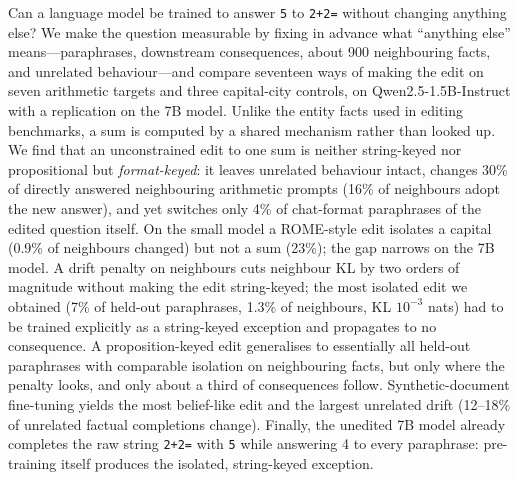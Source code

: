 Can a language model be trained to answer \texttt{5} to \texttt{2+2=} without changing anything else? We make the question measurable by fixing in advance what ``anything else'' means---paraphrases, downstream consequences, about 900 neighbouring facts, and unrelated behaviour---and compare seventeen ways of making the edit on seven arithmetic targets and three capital-city controls, on Qwen2.5-1.5B-Instruct with a replication on the 7B model. Unlike the entity facts used in editing benchmarks, a sum is computed by a shared mechanism rather than looked up. We find that an unconstrained edit to one sum is neither string-keyed nor propositional but \emph{format-keyed}: it leaves unrelated behaviour intact, changes 30\% of directly answered neighbouring arithmetic prompts (16\% of neighbours adopt the new answer), and yet switches only 4\% of chat-format paraphrases of the edited question itself. On the small model a ROME-style edit isolates a capital (0.9\% of neighbours changed) but not a sum (23\%); the gap narrows on the 7B model. A drift penalty on neighbours cuts neighbour KL by two orders of magnitude without making the edit string-keyed; the most isolated edit we obtained (7\% of held-out paraphrases, 1.3\% of neighbours, KL $10^{-3}$ nats) had to be trained explicitly as a string-keyed exception and propagates to no consequence. A proposition-keyed edit generalises to essentially all held-out paraphrases with comparable isolation on neighbouring facts, but only where the penalty looks, and only about a third of consequences follow. Synthetic-document fine-tuning yields the most belief-like edit and the largest unrelated drift (12--18\% of unrelated factual completions change). Finally, the unedited 7B model already completes the raw string \texttt{2+2=} with \texttt{5} while answering 4 to every paraphrase: pre-training itself produces the isolated, string-keyed exception.
